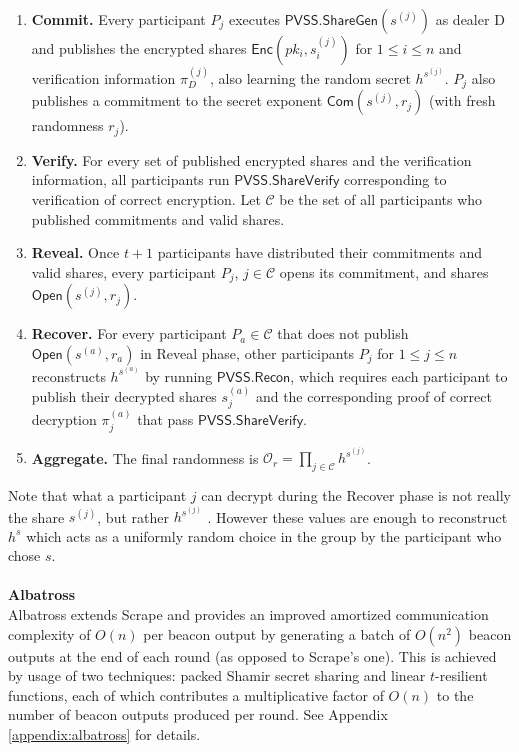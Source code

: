 \documentclass[letterpaper,twocolumn,10pt]{article}
\theoremstyle{definition}
\theoremstyle{remark}
\begin{document}
\begin{enumerate}
\item \textbf{Commit.} Every participant $P_j$ executes $\mathsf{PVSS.ShareGen}(s^{(j)})$ as dealer D and publishes the encrypted shares $\mathsf{Enc}(pk_i, s^{(j)}_i)$ for $1 \le i \le n$ and verification information $\pi_D^{(j)}$, also learning the random secret $h^{s^{(j)}}$. $P_j$ also publishes a commitment to the secret exponent $\mathsf{Com}(s^{(j)}, r_j)$ (with fresh randomness $r_j$).
\item \textbf{Verify.} For every set of published encrypted shares and the verification information, all participants run $\mathsf{PVSS.ShareVerify}$ corresponding to verification of correct encryption. Let $\mathcal{C}$ be the set of all participants who published commitments and valid shares.
\item \textbf{Reveal.} Once $t+1$ participants have distributed their commitments and valid shares, every participant $P_j$, $j \in \mathcal{C}$ opens its commitment, and shares $\mathsf{Open}(s^{(j)}, r_j)$.
\item \textbf{Recover.} For every participant $P_a \in \mathcal{C}$ that does not publish $\mathsf{Open}(s^{(a)}, r_a)$ in Reveal phase, other participants $P_j$ for $1 \leq j \leq n$ reconstructs $h^{s^{(a)}}$ by running $\mathsf{PVSS.Recon}$, which requires each participant to publish their decrypted shares $s_j^{(a)}$ and the corresponding proof of correct decryption $\pi_j^{(a)}$ that pass $\mathsf{PVSS.ShareVerify}$.

\item \textbf{Aggregate.} The final randomness is $\mathcal{O}_r = \prod_{j \in \mathcal{C}} h^{s^{(j)}}$.
\end{enumerate}
Note that what a participant $j$ can decrypt during the Recover phase is not really the share $s^{(j)}$, but rather $h^{s^{(j)}}$ . However these values are enough to reconstruct $h^s$ which acts as a uniformly random choice in the group by the participant who chose $s$. \\\\
\textbf{Albatross}\\
Albatross \cite{cascudo2020albatross} extends Scrape and provides an improved amortized communication complexity of $O(n)$ per beacon output by generating a batch of $O(n^2)$ beacon outputs at the end of each round (as opposed to Scrape's one). This is achieved by usage of two techniques: packed Shamir secret sharing and linear $t$-resilient functions, each of which contributes a multiplicative factor of $O(n)$ to the number of beacon outputs produced per round. See Appendix \ref{appendix:albatross} for details.
\end{document}
